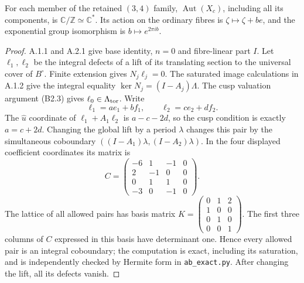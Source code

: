 \begin{proposition}[B.4.1; Proved]\label{st:B.4.1}
For each member of the retained $(3,4)$ family, $\operatorname{Aut}(X_c)$, including all its components, is $\mathbb C/\mathbb Z\simeq\mathbb C^*$. Its action on the ordinary fibres is $\zeta\mapsto\zeta+be$, and the exponential group isomorphism is $b\mapsto e^{2\pi ib}$.
\end{proposition}
\begin{proof}
A.1.1 and A.2.1 give base identity, $n=0$ and fibre-linear part $I$. Let $\ell_1,\ell_2$ be the integral defects of a lift of its translating section to the universal cover of $B^\circ$. Finite extension gives $N_j\ell_j=0$. The saturated image calculations in A.1.2 give the integral equality $\ker N_j=(I-A_j)\Lambda$. The cusp valuation argument (B2.3) gives $\ell_0\in\Lambda_{\rm tor}$. Write
\[
 \ell_1=ae_1+bf_1,\qquad \ell_2=ce_2+df_2.
\]
The $\widehat u$ coordinate of $\ell_1+A_1\ell_2$ is $a-c-2d$, so the cusp condition is exactly $a=c+2d$. Changing the global lift by a period $\lambda$ changes this pair by the simultaneous coboundary $((I-A_1)\lambda,(I-A_2)\lambda)$. In the four displayed coefficient coordinates its matrix is
\[
 C=\begin{pmatrix}-6&1&-1&0\\2&-1&0&0\\0&1&1&0\\-3&0&-1&0\end{pmatrix}.
\]
The lattice of all allowed pairs has basis matrix
$K=\left(\begin{smallmatrix}0&1&2\\1&0&0\\0&1&0\\0&0&1\end{smallmatrix}\right)$. The first three columns of $C$ expressed in this basis have determinant one. Hence every allowed pair is an integral coboundary; the computation is exact, including its saturation, and is independently checked by Hermite form in \texttt{ab\_exact.py}. After changing the lift, all its defects vanish.


\end{proof}
